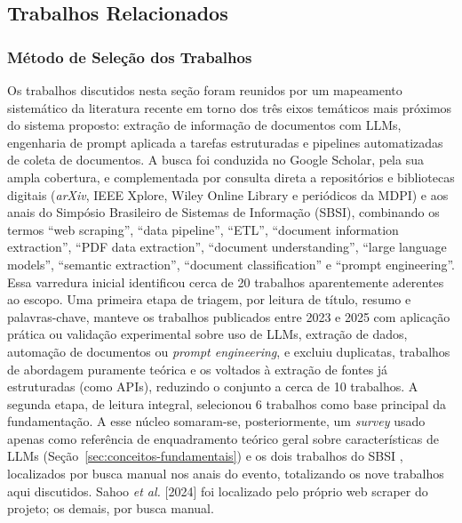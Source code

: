 \documentclass[12pt]{article}
\begin{document}
  \subsection{Trabalhos Relacionados}\label{sec:trabalhos-relacionados}

  \subsubsection{Método de Seleção dos Trabalhos}
  Os trabalhos discutidos nesta seção foram reunidos por um mapeamento sistemático da literatura recente em torno dos três eixos temáticos mais próximos do sistema proposto: extração de informação de documentos com LLMs, engenharia de prompt aplicada a tarefas estruturadas e pipelines automatizadas de coleta de documentos. A busca foi conduzida no Google Scholar, pela sua ampla cobertura, e complementada por consulta direta a repositórios e bibliotecas digitais (\emph{arXiv}, IEEE Xplore, Wiley Online Library e periódicos da MDPI) e aos anais do Simpósio Brasileiro de Sistemas de Informação (SBSI), combinando os termos ``web scraping'', ``data pipeline'', ``ETL'', ``document information extraction'', ``PDF data extraction'', ``document understanding'', ``large language models'', ``semantic extraction'', ``document classification'' e ``prompt engineering''. Essa varredura inicial identificou cerca de 20 trabalhos aparentemente aderentes ao escopo. Uma primeira etapa de triagem, por leitura de título, resumo e palavras-chave, manteve os trabalhos publicados entre 2023 e 2025 com aplicação prática ou validação experimental sobre uso de LLMs, extração de dados, automação de documentos ou \emph{prompt engineering}, e excluiu duplicatas, trabalhos de abordagem puramente teórica e os voltados à extração de fontes já estruturadas (como APIs), reduzindo o conjunto a cerca de 10 trabalhos. A segunda etapa, de leitura integral, selecionou 6 trabalhos \cite{b1,b2,b3,b4,b5,b6} como base principal da fundamentação. A esse núcleo somaram-se, posteriormente, um \emph{survey} \cite{b7} usado apenas como referência de enquadramento teórico geral sobre características de LLMs (Seção~\ref{sec:conceitos-fundamentais}) e os dois trabalhos do SBSI \cite{b8,b9}, localizados por busca manual nos anais do evento, totalizando os nove trabalhos aqui discutidos. Sahoo \emph{et al.} [2024] foi localizado pelo próprio web scraper do projeto; os demais, por busca manual.
\end{document}
